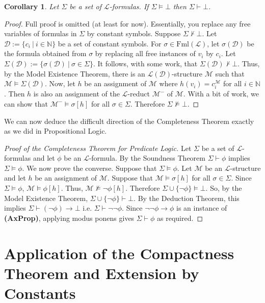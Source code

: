 \documentclass[11pt]{article}
\newcommand{\proves}{\vdash}
\newcommand{\Fml}{\textrm{Fml}}
\newtheorem{cor}[theorem]{Corollary}
\newcommand{\mcal}[1]{\mathcal{#1}}
\newcommand{\N}{\mathbb{N}}
\newcommand{\st}{\ \vert \ }
\begin{document}
\begin{cor}
Let $\Sigma$ be a set of $\mcal{L}$-formulas. If $\Sigma\models \bot$ then $\Sigma \proves \bot$.
\end{cor}
\begin{proof}
Full proof is omitted (at least for now). Essentially, you replace any free variables of formulas in $\Sigma$ by constant symbols. Suppose $\Sigma\nvdash\bot$. Let $\mcal{D}:=\{c_i\st i\in\N\}$ be a set of constant symbols. For $\sigma\in\Fml(\mcal{L})$, let $\sigma(\mcal{D})$ be the formula obtained from $\sigma$ by replacing all free instances of $v_i$ by $c_i$. Let $\Sigma(\mcal{D}):=\{\sigma(\mcal{D})\st \sigma\in \Sigma\}$. It follows, with some work, that $\Sigma(\mcal{D})\nvdash \bot$. Thus, by the Model Existence Theorem, there is an $\mcal{L}(\mcal{D})$-structure $\mcal{M}$ such that $\mcal{M}\models \Sigma(\mcal{D})$. Now, let $h$ be an assignment of $\mcal{M}$ where $h(v_i)=c_i^\mcal{M}$ for all $i\in\N$. Then $h$ is also an assignment of the $\mcal{L}$-reduct $\mcal{M}^{-}$ of $\mcal{M}$. With a bit of work, we can show that $\mcal{M}^{-}\models \sigma[h]$ for all $\sigma\in\Sigma$. Therefore $\Sigma\nvDash\bot$.
\end{proof}

We can now deduce the difficult direction of the Completeness Theorem exactly as we did in Propositional Logic.

\begin{proof}[Proof of the Completeness Theorem for Predicate Logic]
Let $\Sigma$ be a set of $\mcal{L}$-formulas and let $\phi$ be an $\mcal{L}$-formula. By the Soundness Theorem $\Sigma\proves \phi$ implies $\Sigma\models \phi$.
We now prove the converse. Suppose that $\Sigma\models \phi$. Let $\mcal{M}$ be an $\mcal{L}$-structure and let $h$ be an assignment of $\mcal{M}$. Suppose that $\mcal{M}\models \sigma[h]$ for all $\sigma \in \Sigma$. Since $\Sigma\models \phi$, $\mcal{M}\models \phi[h]$. Thus, $\mcal{M}\nvDash \neg\phi[h]$. Therefore $\Sigma\cup\{\neg \phi\}\models \bot$. So, by the Model Existence Theorem, $\Sigma\cup\{\neg \phi\}\proves \bot$. By the Deduction Theorem, this implies $\Sigma\proves (\neg\phi)\rightarrow \bot$ i.e. $\Sigma\proves \neg\neg\phi$. Since $\neg\neg\phi\rightarrow \phi$ is an instance of \textbf{(AxProp)}, applying modus ponens gives $\Sigma\proves\phi$ as required.
\end{proof}



\section{Application of the Compactness Theorem and Extension by Constants}\label{appcomp}
\end{document}
